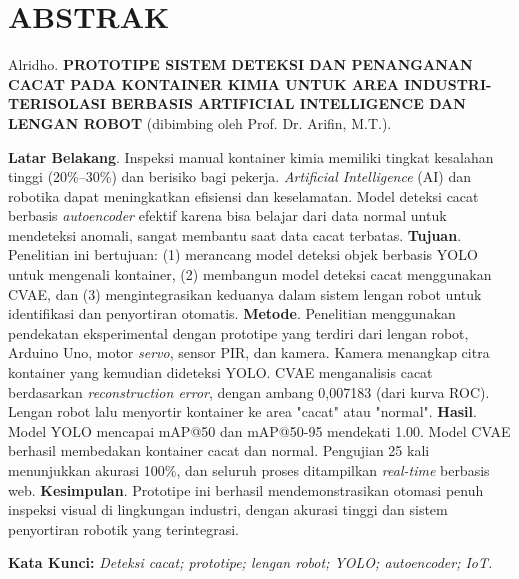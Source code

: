 \begingroup
\singlespacing
\chapter*{ABSTRAK}

\noindent
Alridho. \textbf{PROTOTIPE SISTEM DETEKSI DAN PENANGANAN CACAT PADA KONTAINER KIMIA UNTUK AREA INDUSTRI-TERISOLASI BERBASIS ARTIFICIAL INTELLIGENCE DAN LENGAN ROBOT} (dibimbing oleh Prof. Dr. Arifin, M.T.). \par

\vspace*{0.1cm}

\noindent
\textbf{Latar Belakang}. Inspeksi manual kontainer kimia memiliki tingkat kesalahan tinggi (20\%–30\%) dan berisiko bagi pekerja. \textit{Artificial Intelligence} (AI) dan robotika dapat meningkatkan efisiensi dan keselamatan. Model deteksi cacat berbasis \textit{autoencoder} efektif karena bisa belajar dari data normal untuk mendeteksi anomali, sangat membantu saat data cacat terbatas. \textbf{Tujuan}. Penelitian ini bertujuan: (1) merancang model deteksi objek berbasis YOLO untuk mengenali kontainer, (2) membangun model deteksi cacat menggunakan CVAE, dan (3) mengintegrasikan keduanya dalam sistem lengan robot untuk identifikasi dan penyortiran otomatis. \textbf{Metode}. Penelitian menggunakan pendekatan eksperimental dengan prototipe yang terdiri dari lengan robot, Arduino Uno, motor \textit{servo}, sensor PIR, dan kamera. Kamera menangkap citra kontainer yang kemudian dideteksi YOLO. CVAE menganalisis cacat berdasarkan \textit{reconstruction error}, dengan ambang 0{,}007183 (dari kurva ROC). Lengan robot lalu menyortir kontainer ke area "cacat" atau "normal". \textbf{Hasil}. Model YOLO mencapai mAP@50 dan mAP@50-95 mendekati 1.00. Model CVAE berhasil membedakan kontainer cacat dan normal. Pengujian 25 kali menunjukkan akurasi 100\%, dan seluruh proses ditampilkan \textit{real-time} berbasis web. \textbf{Kesimpulan}. Prototipe ini berhasil mendemonstrasikan otomasi penuh inspeksi visual di lingkungan industri, dengan akurasi tinggi dan sistem penyortiran robotik yang terintegrasi. \par

\vspace*{0.1cm}

\noindent
\textbf{Kata Kunci:} \textit{Deteksi cacat; prototipe; lengan robot; YOLO; autoencoder; IoT.}

\endgroup

\newpage

